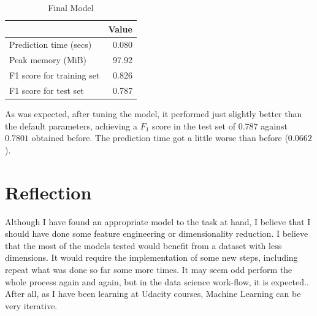 \documentclass[a4paper]{article}
\begin{document}
\begin{table}[ht]
\centering
\begin{tabular}{l|r}
 & Value \\\hline
Prediction time (secs) & 0.080 \\
Peak memory (MiB) & 97.92 \\
F1 score for training set & 0.826 \\
F1 score for test set & 0.787 \\
\end{tabular}
\caption{\label{tab:finalmodel}Final Model}
\end{table}

As was expected, after tuning the model, it performed just slightly better than the default parameters, achieving a $F_1$ score in the test set of $0.787$ against $0.7801$ obtained before. The prediction time got a little worse than before ($0.0662$).


\section{Reflection}
Although I have found an appropriate model to the task at hand, I believe that I should have done some feature engineering or dimensionality reduction. I believe that the most of the models tested would benefit from a dataset with less dimensions. It would require the implementation of some new steps, including repeat what was done so far some more times. It may seem odd perform the whole process again and again, but in the data science work-flow, it is expected.. After all, as I have been learning at Udacity courses, Machine Learning can be very iterative.






\end{document}
